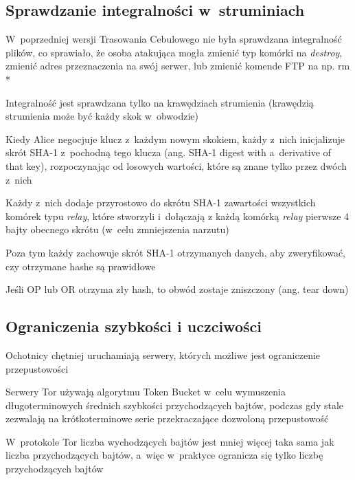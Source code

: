   \subsection{Sprawdzanie integralności w~struminiach}
  \begin{description}
    \item W~poprzedniej wersji Trasowania Cebulowego nie była sprawdzana integralność plików, co sprawiało, że osoba atakująca mogła zmienić typ komórki na \textit{destroy}, zmienić adres przeznaczenia na swój serwer, lub zmienić komende FTP na np. rm *
    \item Integralność jest sprawdzana tylko na krawędziach strumienia (krawędzią strumienia może być każdy skok w~obwodzie)
    \item Kiedy Alice negocjuje klucz z~każdym nowym skokiem, każdy z~nich inicjalizuje skrót SHA-1 z~pochodną tego klucza (ang. SHA-1 digest with a~derivative of that key), rozpoczynając od losowych wartości, które są znane tylko przez dwóch z~nich
    \item Każdy z~nich dodaje przyrostowo do skrótu SHA-1 zawartości wszystkich komórek typu \textit{relay}, które stworzyli i~dołączają z każdą komórką \textit{relay} pierwsze 4 bajty obecnego skrótu (w~celu zmniejszenia narzutu)
    \item Poza tym każdy zachowuje skrót SHA-1 otrzymanych danych, aby zweryfikować, czy otrzymane hashe są prawidłowe 
    \item Jeśli OP lub OR otrzyma zły hash, to obwód zostaje zniszczony (ang. tear down)
  \end{description}

\subsection{Ograniczenia szybkości i uczciwości}
\begin{description}
  \item Ochotnicy chętniej uruchamiają serwery, których możliwe jest ograniczenie przepustowości
  \item Serwery Tor używają algorytmu Token Bucket w~celu wymuszenia długoterminowych średnich szybkości przychodzących bajtów, podczas gdy stale zezwalają na krótkoterminowe serie przekraczające dozwoloną przepustowość
  \item W~protokole Tor liczba wychodzących bajtów jest mniej więcej taka sama jak liczba przychodzących bajtów, a~więc w~praktyce ogranicza się tylko liczbę przychodzących bajtów
\end{description}


